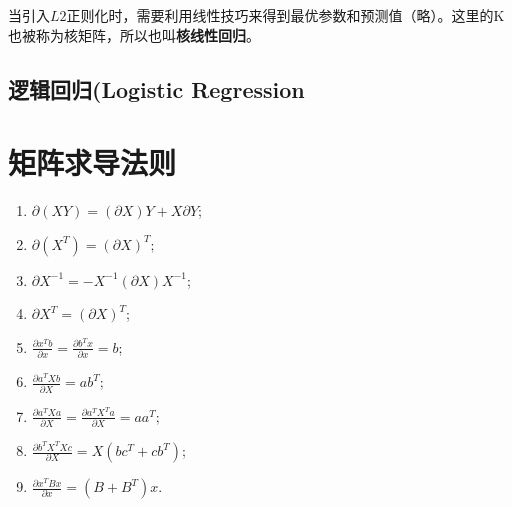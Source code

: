 当引入$L2$正则化时，需要利用线性技巧来得到最优参数和预测值（略）。这里的K也被称为核矩阵，所以也叫\textbf{核线性回归}。

\subsection{逻辑回归(Logistic Regression}




\newpage
\appendix

\section{矩阵求导法则}
\label{matrix gradient}
\begin{enumerate}
  \item $\partial (XY) = (\partial X)Y + X\partial Y$;
  \item $\partial (X^T) = (\partial X)^T;$
  \item $\partial X^{-1} = -X^{-1}(\partial X)X^{-1}$;
  \item $\partial X^T = (\partial X)^T$;
  \item $\displaystyle \frac{\partial x^T b}{\partial x} = \displaystyle\frac{\partial b^T x}{\partial x} = b$;
  \item $\displaystyle \frac{\partial a^TXb}{\partial X} = ab^T$;
  \item $\displaystyle \frac{\partial a^TXa}{\partial X} = \frac{\partial a^TX^Ta}{\partial X} = aa^T;$
  \item $\displaystyle \frac{\partial b^TX^TXc}{\partial X} = X(bc^T+cb^T)$;
  \item $\displaystyle \frac{\partial x^TBx}{\partial x} = (B+B^T)x$.
\end{enumerate}



















